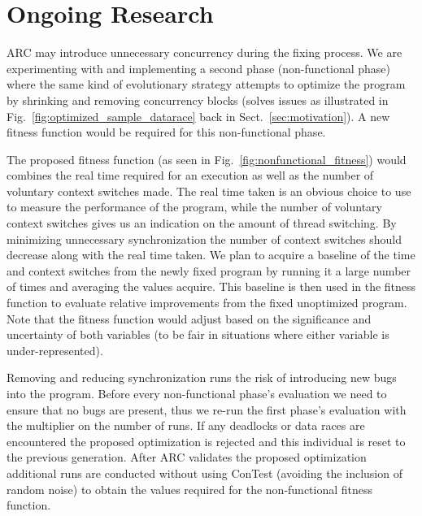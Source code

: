 \section{Ongoing Research}
\label{sec:ongoing}

ARC may introduce unnecessary concurrency during the fixing process. We are
experimenting with and implementing a second phase (non-functional phase) where
the same kind of evolutionary strategy attempts to optimize the program by
shrinking and removing concurrency blocks (solves issues as illustrated in
Fig.~\ref{fig:optimized_sample_datarace} back in Sect.~\ref{sec:motivation}). A
new fitness function would be required for this non-functional phase.

The proposed fitness function (as seen in Fig.~\ref{fig:nonfunctional_fitness})
would combines the real time required for an execution as well as the number of
voluntary context switches made. The real time taken is an obvious choice to
use to measure the performance of the program, while the number of voluntary
context switches gives us an indication on the amount of thread switching. By
minimizing unnecessary synchronization the number of context switches should
decrease along with the real time taken. We plan to acquire a baseline of the
time and context switches from the newly fixed program by running it a large
number of times and averaging the values acquire. This baseline is then used in
the fitness function to evaluate relative improvements from the fixed
unoptimized program. Note that the fitness function would adjust based on the
significance and uncertainty of both variables (to be fair in situations where
either variable is under-represented).

Removing and reducing synchronization runs the risk of introducing new bugs
into the program. Before every non-functional phase's evaluation we need to
ensure that no bugs are present, thus we re-run the first phase's evaluation
with the multiplier on the number of runs. If any deadlocks or data races are
encountered the proposed optimization is rejected and this individual is reset
to the previous generation. After ARC validates the proposed optimization
additional runs are conducted without using ConTest (avoiding the inclusion of
random noise) to obtain the values required for the non-functional fitness
function.

